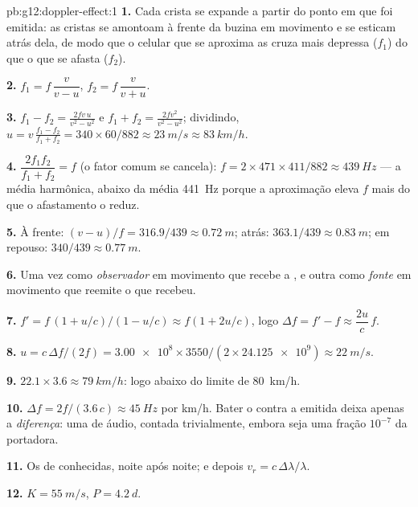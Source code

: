 \begin{solution}{pb:g12:doppler-effect:1}
\textbf{1.} Cada crista se expande a partir do ponto em que foi emitida:
as cristas se amontoam à frente da buzina em movimento e se esticam atrás
dela, de modo que o celular que se aproxima as cruza mais depressa
($f_1$) do que o que se afasta ($f_2$).

\textbf{2.} $f_1 = f\,\dfrac{v}{v - u}$, \quad
$f_2 = f\,\dfrac{v}{v + u}$.

\textbf{3.} $f_1 - f_2 = \frac{2fv\,u}{v^2 - u^2}$ e
$f_1 + f_2 = \frac{2fv^2}{v^2 - u^2}$; dividindo,
$u = v\,\frac{f_1 - f_2}{f_1 + f_2} = 340 \times 60/882 \approx
\qty{23}{m/s} \approx \qty{83}{km/h}$.

\textbf{4.} $\dfrac{2f_1 f_2}{f_1 + f_2} = f$ (o fator comum se cancela):
$f = 2 \times 471 \times 411/882 \approx \qty{439}{Hz}$ --- a média
harmônica, abaixo da média \qty{441}{Hz} porque a aproximação eleva $f$
mais do que o afastamento o reduz.

\textbf{5.} À frente: $(v - u)/f = 316.9/439 \approx \qty{0.72}{m}$;
atrás: $363.1/439 \approx \qty{0.83}{m}$; em repouso:
$340/439 \approx \qty{0.77}{m}$.

\textbf{6.} Uma vez como \emph{observador} em movimento que recebe a
, e outra como \emph{fonte} em movimento que reemite o que recebeu.

\textbf{7.} $f' = f\,(1 + u/c)/(1 - u/c) \approx f(1 + 2u/c)$, logo
$\Delta f = f' - f \approx \dfrac{2u}{c}\,f$.

\textbf{8.} $u = c\,\Delta f/(2f) = \num{3.00e8} \times
3550/(2 \times \num{24.125e9}) \approx \qty{22}{m/s}$.

\textbf{9.} $22.1 \times 3.6 \approx \qty{79}{km/h}$: logo abaixo do
limite de \qty{80}{km/h}.

\textbf{10.} $\Delta f = 2f/(3.6\,c) \approx \qty{45}{Hz}$ por
\unit{km/h}. Bater o  contra a  emitida deixa apenas a
\emph{diferença}: uma  de áudio, contada trivialmente, embora
seja uma fração $10^{-7}$ da portadora.

\textbf{11.} Os  de  conhecidas,
noite após noite; e depois $v_r = c\,\Delta\lambda/\lambda$.

\textbf{12.} $K = \qty{55}{m/s}$, $P = \qty{4.2}{d}$.


\end{solution}
